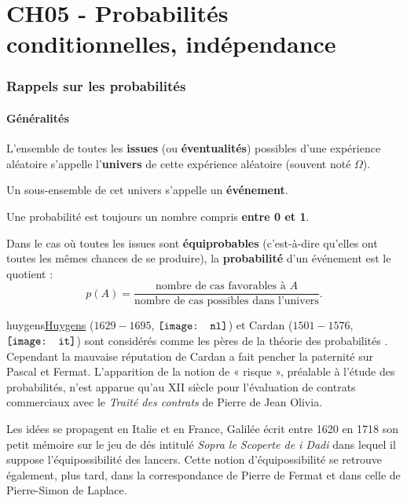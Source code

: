 \documentclass[a4paper,11pt]{article}
\author{Pierquet}
\title{\nomfichier}
\begin{document}
\pagestyle{fancy}

\part{CH05 - Probabilités conditionnelles, indépendance}

\section{Rappels sur les probabilités}

\subsection{Généralités}

\begin{cdefi}[s]
L'ensemble de toutes les \textbf{issues} (ou \textbf{éventualités}) possibles d'une expérience aléatoire s'appelle l'\textbf{univers} de cette expérience aléatoire (souvent noté $\Omega$).

Un sous-ensemble de cet univers s'appelle un \textbf{événement}.
\end{cdefi}

\begin{cprop}
Une probabilité est toujours un nombre compris \textbf{entre 0 et 1}.

Dans le cas où toutes les issues sont \textbf{équiprobables} (c'est-à-dire qu'elles ont toutes les mêmes chances de se produire), la \textbf{probabilité} d'un événement est le quotient : \[p(A)=\dfrac{\text{nombre de cas favorables à } A}{\text{nombre de cas possibles dans l'univers}}.\]
\end{cprop}

\begin{chistoire}
\vspace{-0.22cm}
\lettrine[findent=.5em,nindent=0pt,lines=3,image,novskip=0pt]{huygens}{}\uline{Huygens} ($1629-1695$, $\vcenter{\hbox{\texttt{[image: nl]}}}$) et Cardan ($1501-1576$, $\vcenter{\hbox{\texttt{[image: it]}}}$) sont considérés comme les \og pères de la théorie des probabilités \fg. Cependant la mauvaise réputation de Cardan a fait pencher la paternité sur Pascal et Fermat. L'apparition de la notion de « risque », préalable à l'étude des probabilités, n'est apparue qu'au XII siècle pour l'évaluation de contrats commerciaux avec le \textit{Traité des contrats} de Pierre de Jean Olivia.

Les idées se propagent en Italie et en France, Galilée écrit entre 1620 en 1718 son petit mémoire sur le jeu de dés intitulé \textit{Sopra le Scoperte de i Dadi} dans lequel il suppose l'équipossibilité des lancers. Cette notion d'équipossibilité se retrouve également, plus tard, dans la correspondance de Pierre de Fermat et dans celle de Pierre-Simon de Laplace.
\end{chistoire}
\end{document}
